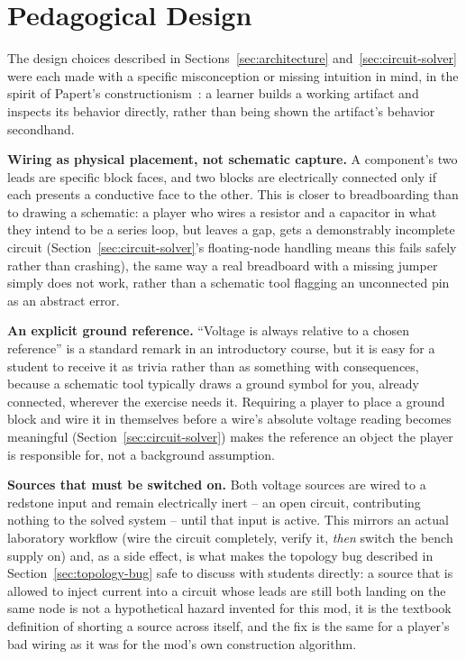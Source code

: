 \section{Pedagogical Design}
\label{sec:pedagogy}

The design choices described in Sections~\ref{sec:architecture}
and~\ref{sec:circuit-solver} were each made with a specific misconception or missing
intuition in mind, in the spirit of Papert's constructionism~\cite{papert1980mindstorms}:
a learner builds a working artifact and inspects its behavior directly, rather than being
shown the artifact's behavior secondhand.

\textbf{Wiring as physical placement, not schematic capture.} A component's two leads are
specific block faces, and two blocks are electrically connected only if each presents a
conductive face to the other. This is closer to breadboarding than to drawing a schematic:
a player who wires a resistor and a capacitor in what they intend to be a series loop, but
leaves a gap, gets a demonstrably incomplete circuit (Section~\ref{sec:circuit-solver}'s
floating-node handling means this fails safely rather than crashing), the same way a real
breadboard with a missing jumper simply does not work, rather than a schematic tool
flagging an unconnected pin as an abstract error.

\textbf{An explicit ground reference.} ``Voltage is always relative to a chosen reference''
is a standard remark in an introductory course, but it is easy for a student to receive it
as trivia rather than as something with consequences, because a schematic tool typically
draws a ground symbol for you, already connected, wherever the exercise needs it. Requiring
a player to place a ground block and wire it in themselves before a wire's absolute voltage
reading becomes meaningful (Section~\ref{sec:circuit-solver}) makes the reference an object
the player is responsible for, not a background assumption.

\textbf{Sources that must be switched on.} Both voltage sources are wired to a redstone
input and remain electrically inert -- an open circuit, contributing nothing to the solved
system -- until that input is active. This mirrors an actual laboratory workflow (wire the
circuit completely, verify it, \emph{then} switch the bench supply on) and, as a side
effect, is what makes the topology bug described in Section~\ref{sec:topology-bug} safe to
discuss with students directly: a source that is allowed to inject current into a circuit
whose leads are still both landing on the same node is not a hypothetical hazard invented
for this mod, it is the textbook definition of shorting a source across itself, and the fix
is the same for a player's bad wiring as it was for the mod's own construction algorithm.

